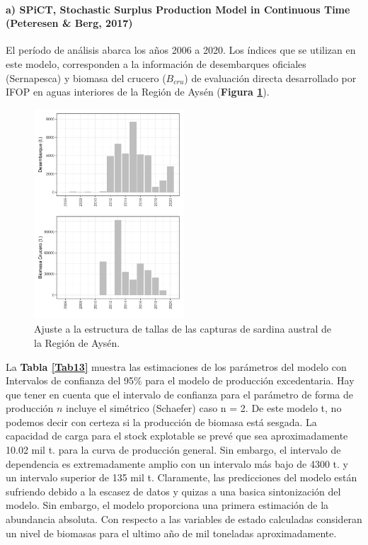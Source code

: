 \documentclass[
  spanish,
]{article}
\begin{document}
\vspace{0.5cm}

\hypertarget{a-spict-stochastic-surplus-production-model-in-continuous-time-peteresen-berg-2017-1}{%
\paragraph{a) SPiCT, Stochastic Surplus Production Model in Continuous
Time (Peteresen \& Berg,
2017)}\label{a-spict-stochastic-surplus-production-model-in-continuous-time-peteresen-berg-2017-1}}

\quad

El período de análisis abarca los años 2006 a 2020. Los índices que se
utilizan en este modelo, corresponden a la información de desembarques
oficiales (Sernapesca) y biomasa del crucero (\(B_{cru}\)) de evaluación
directa desarrollado por IFOP en aguas interiores de la Región de Aysén
(\textbf{Figura \ref{Fig18}}).

\begin{figure}[h!]
\centering
\includegraphics[width=0.5\textwidth]{SPiCT/Figuras/datos-1.pdf}
\caption{Ajuste a la estructura de tallas de las capturas de sardina austral de la Región de Aysén.}
\label{Fig18}
\end{figure}

\pagebreak

La \textbf{Tabla \ref{Tab13}} muestra las estimaciones de los parámetros
del modelo con Intervalos de confianza del 95\% para el modelo de
producción excedentaria. Hay que tener en cuenta que el intervalo de
confianza para el parámetro de forma de producción \(n\) incluye el
simétrico (Schaefer) caso n = 2. De este modelo t, no podemos decir con
certeza si la producción de biomasa está sesgada. La capacidad de carga
para el stock explotable se prevé que sea aproximadamente 10.02 mil t.
para la curva de producción general. Sin embargo, el intervalo de
dependencia es extremadamente amplio con un intervalo más bajo de 4300
t. y un intervalo superior de 135 mil t. Claramente, las predicciones
del modelo están sufriendo debido a la escasez de datos y quizas a una
basica sintonización del modelo. Sin embargo, el modelo proporciona una
primera estimación de la abundancia absoluta. Con respecto a las
variables de estado calculadas consideran un nivel de biomasas para el
ultimo año de mil toneladas aproximadamente. \vspace{0.5cm}
\end{document}
